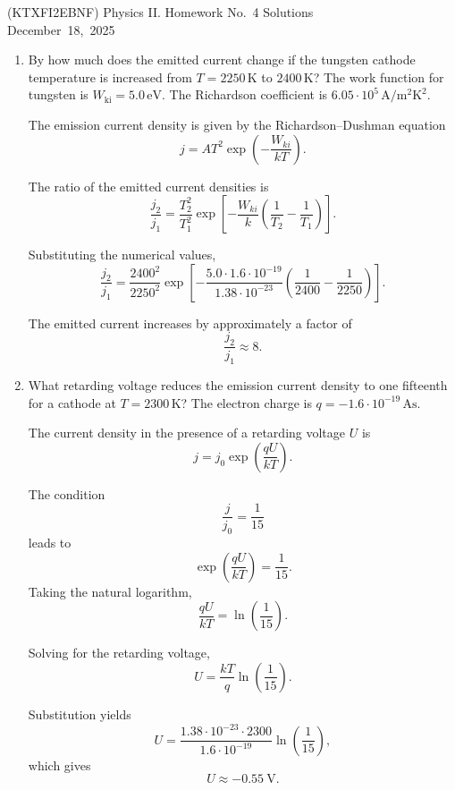 \documentclass[a4paper,12pt]{letter}
\begin{document}
\begin{center}
  (KTXFI2EBNF) Physics II. Homework No.~4 Solutions\\ \smallskip
 December~18,~2025
 \end{center}


\begin{enumerate}

\item By how much does the emitted current change if the tungsten cathode temperature is increased from $T = 2250\,\text{K}$ to $2400\,\text{K}$?  The work function for tungsten is $W_{\text{ki}} = 5.0\,\text{eV}$.  The Richardson coefficient is $6.05 \cdot 10^{5}\,\text{A}/\text{m}^2\text{K}^2$.

  \medskip

The emission current density is given by the Richardson--Dushman equation $$ j = A T^2 \exp\!\left(-\frac{W_{ki}}{k T}\right).$$

The ratio of the emitted current densities is $$ \frac{j_2}{j_1} = \frac{T_2^2}{T_1^2} \exp\!\left[-\frac{W_{ki}}{k}\left(\frac{1}{T_2} - \frac{1}{T_1}\right)\right].$$

Substituting the numerical values, $$ \frac{j_2}{j_1}=\frac{2400^2}{2250^2}\exp\!\left[-\frac{5.0 \cdot 1.6 \cdot 10^{-19}}{1.38 \cdot 10^{-23}}\left(\frac{1}{2400} - \frac{1}{2250}\right)\right].$$

The emitted current increases by approximately a factor of $$\frac{j_2}{j_1} \approx 8.$$


\item What retarding voltage reduces the emission current density to one fifteenth for a cathode at $T = 2300\,\text{K}$?  
    The electron charge is $q = -1.6 \cdot 10^{-19}\,\text{As}$.

    \medskip

The current density in the presence of a retarding voltage $U$ is
$$
j = j_0 \exp\!\left(\frac{q U}{k T}\right).
$$

The condition
$$
\frac{j}{j_0} = \frac{1}{15}
$$
leads to
$$
\exp\!\left(\frac{q U}{k T}\right) = \frac{1}{15}.
$$
Taking the natural logarithm,
$$
\frac{q U}{k T} = \ln\!\left(\frac{1}{15}\right).
$$

Solving for the retarding voltage,
$$
U = \frac{k T}{q} \ln\!\left(\frac{1}{15}\right).
$$

Substitution yields
$$
U =
\frac{1.38 \cdot 10^{-23} \cdot 2300}
{1.6 \cdot 10^{-19}}
\ln\!\left(\frac{1}{15}\right),
$$
which gives
$$
U \approx -0.55\ \mathrm{V}.
$$


\end{enumerate}
\end{document}
